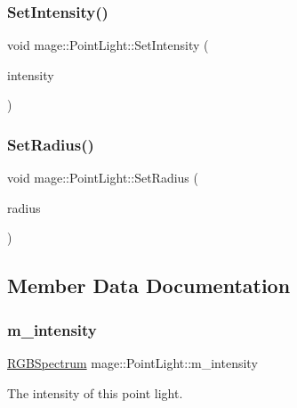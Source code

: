 \subsubsection{\texorpdfstring{Set\+Intensity()}{SetIntensity()}}
{\footnotesize\ttfamily void mage\+::\+Point\+Light\+::\+Set\+Intensity (\begin{DoxyParamCaption}\item[{const \hyperlink{structmage_1_1_r_g_b_spectrum}{R\+G\+B\+Spectrum} \&}]{intensity }\end{DoxyParamCaption})}

\hypertarget{structmage_1_1_point_light_ae7b4c301c148bd78348e26e5b6ad8faf}{}\label{structmage_1_1_point_light_ae7b4c301c148bd78348e26e5b6ad8faf} 
\subsubsection{\texorpdfstring{Set\+Radius()}{SetRadius()}}
{\footnotesize\ttfamily void mage\+::\+Point\+Light\+::\+Set\+Radius (\begin{DoxyParamCaption}\item[{float}]{radius }\end{DoxyParamCaption})}



\subsection{Member Data Documentation}
\hypertarget{structmage_1_1_point_light_ac021a08c4c700c3b19de5f7491a80e4f}{}\label{structmage_1_1_point_light_ac021a08c4c700c3b19de5f7491a80e4f} 
\subsubsection{\texorpdfstring{m\+\_\+intensity}{m\_intensity}}
{\footnotesize\ttfamily \hyperlink{structmage_1_1_r_g_b_spectrum}{R\+G\+B\+Spectrum} mage\+::\+Point\+Light\+::m\+\_\+intensity\hspace{0.3cm}{\ttfamily [private]}}

The intensity of this point light. \hypertarget{structmage_1_1_point_light_a96a5802cc2b06df700f63f8e8a9683eb}{}\label{structmage_1_1_point_light_a96a5802cc2b06df700f63f8e8a9683eb} 

